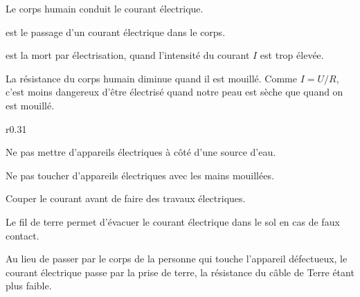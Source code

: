 \vspace*{-8pt}

\pointCyan Le corps humain conduit le courant électrique.

\pointCyan {} est le passage d'un courant électrique dans le corps.

\pointCyan {} est la mort par électrisation, quand l'intensité du courant $I$ est trop élevée.

\pointCyan La résistance du corps humain diminue quand il est mouillé.
Comme $I = U / R$, c'est moins dangereux d'être électrisé quand notre peau est sèche que quand on est mouillé.

\medskip
\begin{wrapfigure}[3]{r}{0.31\linewidth}
  \centering
\end{wrapfigure}

\begin{listePoints}
  \item Ne pas mettre d'appareils électriques à côté d'une source d'eau.
  \item Ne pas toucher d'appareils électriques avec les mains mouillées.
  \item Couper le courant avant de faire des travaux électriques.
\end{listePoints}

\medskip
{}

\begin{importants}
  Le fil de terre permet d'évacuer le courant électrique dans le sol en cas de faux contact.
  
  Au lieu de passer par le corps de la personne qui touche l'appareil défectueux, le courant électrique passe par la prise de terre, la résistance du câble de Terre étant plus faible.
\end{importants}

